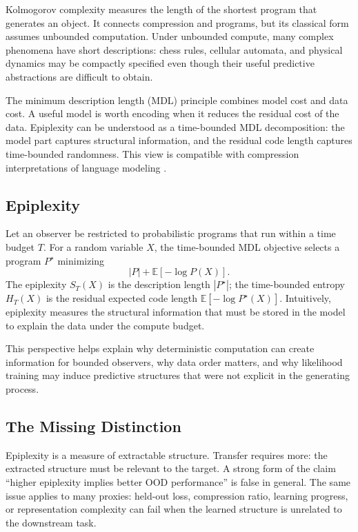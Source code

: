 \documentclass[11pt]{article}
\begin{document}
Kolmogorov complexity measures the length of the shortest program that generates an object. It connects compression and programs, but its classical form assumes unbounded computation. Under unbounded compute, many complex phenomena have short descriptions: chess rules, cellular automata, and physical dynamics may be compactly specified even though their useful predictive abstractions are difficult to obtain.

The minimum description length (MDL) principle \citep{rissanen2004mdl,grunwald2007mdl} combines model cost and data cost. A useful model is worth encoding when it reduces the residual cost of the data. Epiplexity can be understood as a time-bounded MDL decomposition: the model part captures structural information, and the residual code length captures time-bounded randomness. This view is compatible with compression interpretations of language modeling \citep{deletang2023compression}.

\subsection{Epiplexity}

Let an observer be restricted to probabilistic programs that run within a time budget $T$. For a random variable $X$, the time-bounded MDL objective selects a program $P^\star$ minimizing
\begin{equation}
  |P| + \mathbb{E}[-\log P(X)].
\end{equation}
The epiplexity $S_T(X)$ is the description length $|P^\star|$; the time-bounded entropy $H_T(X)$ is the residual expected code length $\mathbb{E}[-\log P^\star(X)]$. Intuitively, epiplexity measures the structural information that must be stored in the model to explain the data under the compute budget.

This perspective helps explain why deterministic computation can create information for bounded observers, why data order matters, and why likelihood training may induce predictive structures that were not explicit in the generating process.

\subsection{The Missing Distinction}

Epiplexity is a measure of extractable structure. Transfer requires more: the extracted structure must be relevant to the target. A strong form of the claim ``higher epiplexity implies better OOD performance'' is false in general. The same issue applies to many proxies: held-out loss, compression ratio, learning progress, or representation complexity can fail when the learned structure is unrelated to the downstream task.
\end{document}
